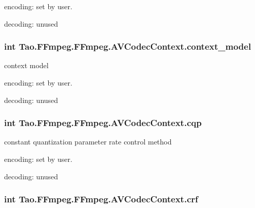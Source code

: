 \begin{DoxyItemize}
\item encoding: set by user.
\item decoding: unused 
\end{DoxyItemize}\hypertarget{struct_tao_1_1_f_fmpeg_1_1_f_fmpeg_1_1_a_v_codec_context_aa1255b12adbd1ed3d3c6afa3410702e4}{
\subsubsection[{context\_\-model}]{\setlength{\rightskip}{0pt plus 5cm}int {\bf Tao.FFmpeg.FFmpeg.AVCodecContext.context\_\-model}}}
\label{struct_tao_1_1_f_fmpeg_1_1_f_fmpeg_1_1_a_v_codec_context_aa1255b12adbd1ed3d3c6afa3410702e4}
context model
\begin{DoxyItemize}
\item encoding: set by user.
\item decoding: unused 
\end{DoxyItemize}\hypertarget{struct_tao_1_1_f_fmpeg_1_1_f_fmpeg_1_1_a_v_codec_context_a892f7bfb0845b9ff0dc8e8a13445ee0b}{
\subsubsection[{cqp}]{\setlength{\rightskip}{0pt plus 5cm}int {\bf Tao.FFmpeg.FFmpeg.AVCodecContext.cqp}}}
\label{struct_tao_1_1_f_fmpeg_1_1_f_fmpeg_1_1_a_v_codec_context_a892f7bfb0845b9ff0dc8e8a13445ee0b}
constant quantization parameter rate control method
\begin{DoxyItemize}
\item encoding: set by user.
\item decoding: unused 
\end{DoxyItemize}\hypertarget{struct_tao_1_1_f_fmpeg_1_1_f_fmpeg_1_1_a_v_codec_context_a9218acaa887a33410f3b6dc3eb50f869}{
\subsubsection[{crf}]{\setlength{\rightskip}{0pt plus 5cm}int {\bf Tao.FFmpeg.FFmpeg.AVCodecContext.crf}}}
